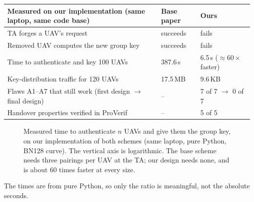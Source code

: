 \documentclass[11pt,openany]{report}
\begin{document}
\begin{center}
\small
\begin{tabularx}{\linewidth}{@{}X l l@{}}
\toprule
\textbf{Measured on our implementation (same laptop, same code base)} & \textbf{Base paper} & \textbf{Ours}\\
\midrule
TA forges a UAV's request & succeeds & fails\\
Removed UAV computes the new group key & succeeds & fails\\
Time to authenticate and key 100 UAVs & 387.6\,s & 6.5\,s ($\approx60\times$ faster)\\
Key-distribution traffic for 120 UAVs & 17.5\,MB & 9.6\,KB\\
Flaws A1--A7 that still work (first design $\rightarrow$ final design) & -- & 7 of 7 $\rightarrow$ 0 of 7\\
Handover properties verified in ProVerif & -- & 5 of 5\\
\bottomrule
\end{tabularx}
\end{center}
\begin{figure}[H]
\centering
{}
\caption{Measured time to authenticate $n$ UAVs and give them the group key, on our implementation of both schemes (same laptop, pure Python, BN128
curve). The vertical axis is logarithmic. The base scheme needs three pairings per UAV at the TA; our design needs none, and is about 60 times
faster at every size.}
\label{fig:measured}
\end{figure}

The times are from pure Python, so only the ratio is meaningful, not the absolute seconds.
\end{document}
